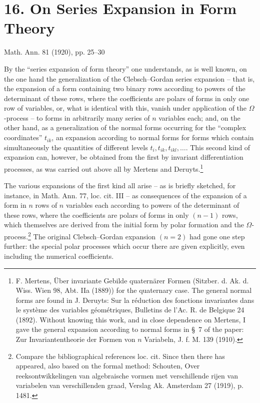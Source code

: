 \documentclass[11pt]{article}
\begin{document}
\section*{16. On Series Expansion in Form Theory}
\begin{center}
Math. Ann. 81 (1920), pp. 25--30
\end{center}

By the ``series expansion of form theory'' one understands, as is well known, on the one hand the generalization of the Clebsch--Gordan series expansion -- that is, the expansion of a form containing two binary rows according to powers of the determinant of these rows, where the coefficients are polars of forms in only one row of variables, or, what is identical with this, vanish under application of the $\Omega$-process -- to forms in arbitrarily many series of $n$ variables each; and, on the other hand, as a generalization of the normal forms occurring for the ``complex coordinates'' $t_{ik}$, an expansion according to normal forms for forms which contain simultaneously the quantities of different levels $t_i,t_{ik},t_{ikl},\ldots$. This second kind of expansion can, however, be obtained from the first by invariant differentiation processes, as was carried out above all by Mertens and Deruyts.\footnote{F. Mertens, Über invariante Gebilde quaternärer Formen (Sitzber. d. Ak. d. Wiss. Wien 98, Abt. IIa (1889)) for the quaternary case. The general normal forms are found in J. Deruyts: Sur la réduction des fonctions invariantes dans le système des variables géométriques, Bulletins de l'Ac. R. de Belgique 24 (1892). Without knowing this work, and in close dependence on Mertens, I gave the general expansion according to normal forms in \S~7 of the paper: Zur Invariantentheorie der Formen von $n$ Variabeln, J. f. M. 139 (1910).}

The various expansions of the first kind all arise -- as is briefly sketched, for instance, in Math. Ann. 77, loc. cit. III -- as consequences of the expansion of a form in $n$ rows of $n$ variables each according to powers of the determinant of these rows, where the coefficients are polars of forms in only $(n-1)$ rows, which themselves are derived from the initial form by polar formation and the $\Omega$-process.\footnote{Compare the bibliographical references loc. cit. Since then there has appeared, also based on the formal method: Schouten, Over reeksontwikkelingen van algebraische vormen met verschillende rijen van variabelen van verschillenden graad, Verslag Ak. Amsterdam 27 (1919), p. 1481.} The original Clebsch--Gordan expansion $(n=2)$ had gone one step further: the special polar processes which occur there are given explicitly, even including the numerical coefficients.
\end{document}
